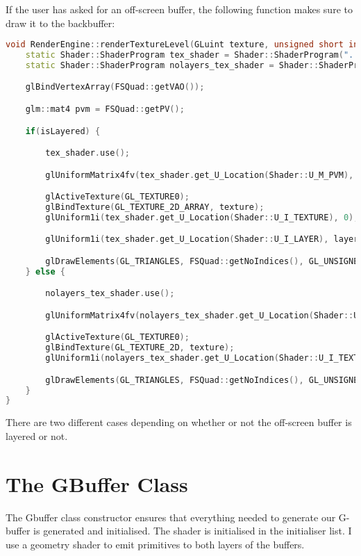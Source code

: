 If the user has asked for an off-screen buffer, the following function makes sure to draw it to the backbuffer:
\begin{lstlisting}[caption={RenderEngine.cpp},language=c++]
void RenderEngine::renderTextureLevel(GLuint texture, unsigned short int layer) {
	static Shader::ShaderProgram tex_shader = Shader::ShaderProgram("../shaders/texture_quad.vert","../shaders/layered_texture.frag");
	static Shader::ShaderProgram nolayers_tex_shader = Shader::ShaderProgram("../shaders/texture_quad.vert","../shaders/unlayered_texture.frag");

	glBindVertexArray(FSQuad::getVAO());

	glm::mat4 pvm = FSQuad::getPV();

	if(isLayered) {

		tex_shader.use();

		glUniformMatrix4fv(tex_shader.get_U_Location(Shader::U_M_PVM), 1, GL_FALSE, glm::value_ptr(pvm));

		glActiveTexture(GL_TEXTURE0);
		glBindTexture(GL_TEXTURE_2D_ARRAY, texture);
		glUniform1i(tex_shader.get_U_Location(Shader::U_I_TEXTURE), 0);

		glUniform1i(tex_shader.get_U_Location(Shader::U_I_LAYER), layer);

		glDrawElements(GL_TRIANGLES, FSQuad::getNoIndices(), GL_UNSIGNED_INT, (void *) 0);
	} else {

		nolayers_tex_shader.use();

		glUniformMatrix4fv(nolayers_tex_shader.get_U_Location(Shader::U_M_PVM), 1, GL_FALSE, glm::value_ptr(pvm));

		glActiveTexture(GL_TEXTURE0);
		glBindTexture(GL_TEXTURE_2D, texture);
		glUniform1i(nolayers_tex_shader.get_U_Location(Shader::U_I_TEXTURE), 0);

		glDrawElements(GL_TRIANGLES, FSQuad::getNoIndices(), GL_UNSIGNED_INT, (void *) 0);
	}
}
\end{lstlisting}
There are two different cases depending on whether or not the off-screen buffer is layered or not.

\section{The GBuffer Class}

The Gbuffer class constructor ensures that everything needed to generate our G-buffer is generated and initialised. The shader is initialised in the initialiser list. I use a geometry shader to emit primitives to both layers of the buffers.

